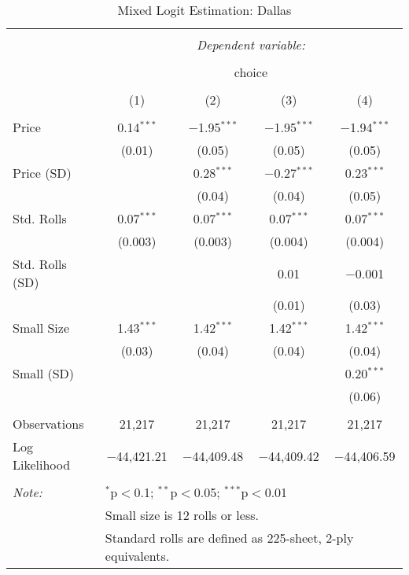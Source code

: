 
\begin{table}[!htbp] \centering 
  \caption{Mixed Logit Estimation: Dallas} 
  \label{tab:mnlDallasRandCoefNoObsHet} 
\begin{tabular}{@{\extracolsep{5pt}}lcccc} 
\\[-1.8ex]\hline 
\hline \\[-1.8ex] 
 & \multicolumn{4}{c}{\textit{Dependent variable:}} \\ 
\cline{2-5} 
\\[-1.8ex] & \multicolumn{4}{c}{choice} \\ 
\\[-1.8ex] & (1) & (2) & (3) & (4)\\ 
\hline \\[-1.8ex] 
 Price & 0.14$^{***}$ & $-$1.95$^{***}$ & $-$1.95$^{***}$ & $-$1.94$^{***}$ \\ 
  & (0.01) & (0.05) & (0.05) & (0.05) \\ 
  Price (SD) &  & 0.28$^{***}$ & $-$0.27$^{***}$ & 0.23$^{***}$ \\ 
  &  & (0.04) & (0.04) & (0.05) \\ 
  Std. Rolls & 0.07$^{***}$ & 0.07$^{***}$ & 0.07$^{***}$ & 0.07$^{***}$ \\ 
  & (0.003) & (0.003) & (0.004) & (0.004) \\ 
  Std. Rolls (SD) &  &  & 0.01 & $-$0.001 \\ 
  &  &  & (0.01) & (0.03) \\ 
  Small Size & 1.43$^{***}$ & 1.42$^{***}$ & 1.42$^{***}$ & 1.42$^{***}$ \\ 
  & (0.03) & (0.04) & (0.04) & (0.04) \\ 
  Small (SD) &  &  &  & 0.20$^{***}$ \\ 
  &  &  &  & (0.06) \\ 
 \hline \\[-1.8ex] 
Observations & 21,217 & 21,217 & 21,217 & 21,217 \\ 
Log Likelihood & $-$44,421.21 & $-$44,409.48 & $-$44,409.42 & $-$44,406.59 \\ 
\hline 
\hline \\[-1.8ex] 
\textit{Note:}  & \multicolumn{4}{l}{$^{*}$p$<$0.1; $^{**}$p$<$0.05; $^{***}$p$<$0.01} \\ 
 & \multicolumn{4}{l}{Small size is 12 rolls or less.} \\ 
 & \multicolumn{4}{l}{Standard rolls are defined as 225-sheet, 2-ply equivalents.} \\ 
\end{tabular} 
\end{table} 

